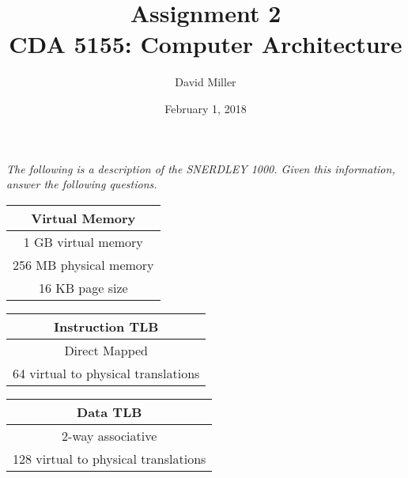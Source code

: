 \documentclass[12pt]{article}
\theoremstyle{remark}
\begin{document}
 
\title{Assignment 2 \\ CDA 5155: Computer Architecture} 
\author{David Miller}
\date{\vspace{-.5cm} February 1, 2018}

\maketitle

\textit{The following is a description of the SNERDLEY 1000. Given this information, answer the following questions.}

\begin{table}[H]
	\footnotesize
	\begin{tabular}[t]{|c|}	
		\multicolumn{1}{c}{\bf Virtual Memory} \\ \hline
		1 GB virtual memory \\ 
		256 MB physical memory   \\
		16 KB page size \\ \hline  
	\end{tabular}
	\hfill
	\begin{tabular}[t]{|c|}
		\multicolumn{1}{c}{\bf Instruction TLB} \\ \hline
		Direct Mapped \\ 
		64 virtual to physical translations \\ \hline 
	\end{tabular}
	\hfill
	\begin{tabular}[t]{|c|}
		\multicolumn{1}{c}{\bf Data TLB} \\ \hline
		2-way associative \\ 
		128 virtual to physical translations \\ \hline 
	\end{tabular} 
\end{table}
\end{document}
